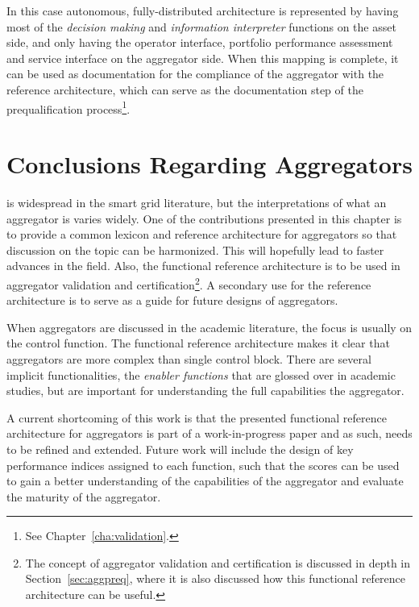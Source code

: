 In this case autonomous, fully-distributed architecture is represented by having  most of the \emph{decision making} and \emph{information interpreter} functions on the asset side, and only having the operator interface, portfolio performance assessment and service interface on the aggregator side. When this mapping is complete, it can be used as documentation for the compliance of the aggregator with the reference architecture, which can serve as the documentation step of the prequalification process\footnote{See Chapter~\ref{cha:validation}.}.

\section{Conclusions Regarding Aggregators}
 is widespread in the smart grid literature, but the interpretations of what an aggregator is varies widely. One of the contributions presented in this chapter is to provide a common lexicon and reference architecture for aggregators so that discussion on the topic can be harmonized. This will hopefully lead to faster advances in the field. Also, the functional reference architecture is to be used in aggregator validation and certification\footnote{The concept of aggregator validation and certification is discussed in depth in Section~\ref{sec:aggpreq}, where it is also discussed how this functional reference architecture can be useful.}. A secondary use for the reference architecture is to serve as a guide for future designs of aggregators.

When aggregators are discussed in the academic literature, the focus is usually on the control function. The functional reference architecture makes it clear that aggregators are more complex than single control block. There are several implicit functionalities, \eg the \emph{enabler functions} that are glossed over in academic studies, but are important for understanding the full capabilities the aggregator.

A current shortcoming of this work is that the presented functional reference architecture for aggregators is part of a work-in-progress paper and as such, needs to be refined and extended. Future work will include the design of key performance indices assigned to each function, such that the scores can be used to gain a better understanding of the capabilities of the aggregator and evaluate the maturity of the aggregator. 


